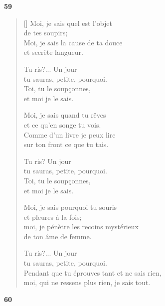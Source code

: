 \documentclass[a4paper,12pt]{book}
\begin{document}
\bigskip

\begin{center}
  \textbf{59}
\end{center}

\settowidth{\versewidth}{pendant que tu éprouves tant et ne sais rien,}

\begin{verse}[\versewidth]
  Moi, je sais quel est l'objet \\
  de tes soupirs; \\
  Moi, je sais la cause de ta douce \\
  et secrète langueur.

  Tu ris?... Un jour \\
  tu sauras, petite, pourquoi. \\
  Toi, tu le soupçonnes, \\
  et moi je le sais.

  Moi, je sais quand tu rêves \\
  et ce qu'en songe tu vois. \\
  Comme d'un livre je peux lire \\
  sur ton front ce que tu tais.

  Tu ris? Un jour \\
  tu sauras, petite, pourquoi. \\
  Toi, tu le soupçonnes, \\
  et moi je le sais.

  Moi, je sais pourquoi tu souris \\
  et pleures à la fois; \\
  moi, je pénètre les recoins mystérieux \\
  de ton âme de femme.

  Tu ris?... Un jour \\
  tu sauras, petite, pourquoi. \\
  Pendant que tu éprouves tant et ne sais rien, \\
  moi, qui ne ressens plus rien, je sais tout.
\end{verse}

\bigskip

\begin{center}
  \textbf{60}
\end{center}

\settowidth{\versewidth}{fleur que je touche s'effeuille.}
\end{document}
